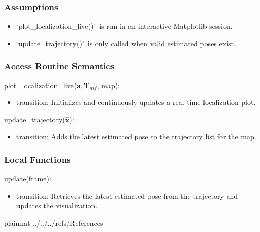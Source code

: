 \documentclass[12pt, titlepage]{article}
\begin{document}
\subsubsection{Assumptions}
\begin{itemize}
  \item \lq plot\_localization\_live()\rq~is run in an interactive Matplotlib session.
  \item \lq update\_trajectory()\rq~is only called when valid estimated poses exist.
\end{itemize}

\subsubsection{Access Routine Semantics}

\noindent plot\_localization\_live($\mathbf{a}, \mathbf{T}_{mf}$, map):
\begin{itemize}
\item transition: Initializes and continuously updates a real-time localization plot.
\end{itemize}

\noindent update\_trajectory($\hat{\mathbf{x}}$):
\begin{itemize}
\item transition: Adds the latest estimated pose to the trajectory list for the map.
\end{itemize}


\subsubsection{Local Functions}
\noindent update(frame):
\begin{itemize}
    \item transition: Retrieves the latest estimated pose from the trajectory and updates the visualization.
\end{itemize}

\newpage


 {plainnat}
 {../../../refs/References}






\end{document}

